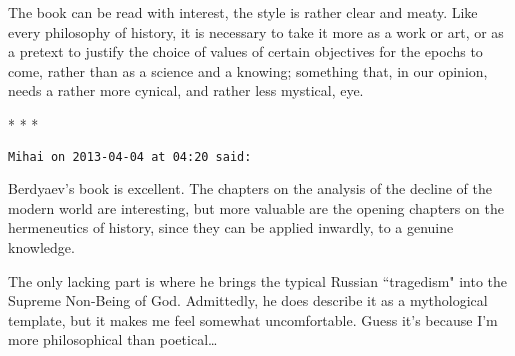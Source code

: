 The book can be read with interest, the style is rather clear and meaty. Like every philosophy of history, it is necessary to take it more as a work or art, or as a pretext to justify the choice of values of certain objectives for the epochs to come, rather than as a science and a knowing; something that, in our opinion, needs a rather more cynical, and rather less mystical, eye.




\begin{center}* * *\end{center}

\begin{footnotesize}\begin{sffamily}



\texttt{Mihai on 2013-04-04 at 04:20 said: }

Berdyaev's book is excellent. The chapters on the analysis of the decline of the modern world are interesting, but more valuable are the opening chapters on the hermeneutics of history, since they can be applied inwardly, to a genuine knowledge. 

The only lacking part is where he brings the typical Russian ``tragedism" into the Supreme Non-Being of God. Admittedly, he does describe it as a mythological template, but it makes me feel somewhat uncomfortable. Guess it's because I'm more philosophical than poetical…


\end{sffamily}\end{footnotesize}

